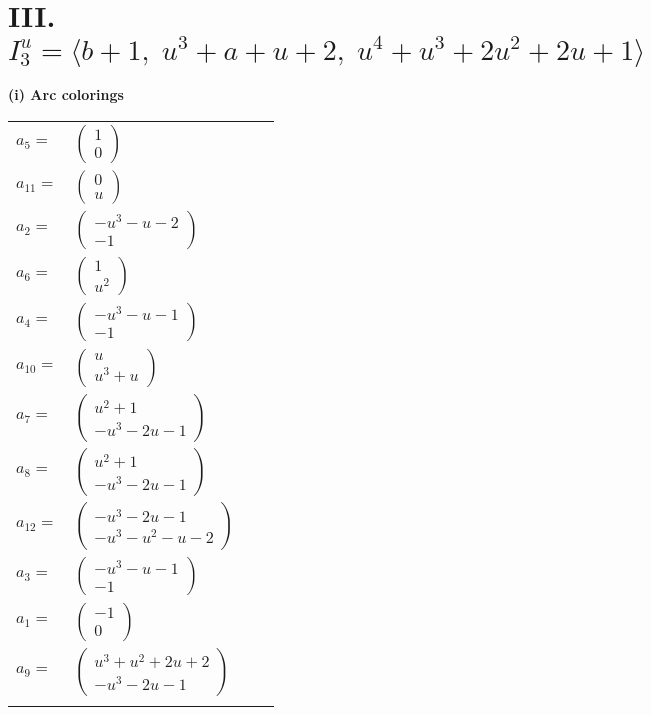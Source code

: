 \documentclass[1p]{elsarticle_modified}
\theoremstyle{definition}
\begin{document}
\centering \section*{III. $I^u_{3}= \langle b+1,\;u^3+a+u+2,\;u^4+u^3+2 u^2+2 u+1 \rangle$}
\flushleft \textbf{(i) Arc colorings}\\
\begin{tabular}{m{7pt} m{180pt} m{7pt} m{180pt} }
\flushright $a_{5}=$&$\begin{pmatrix}1\\0\end{pmatrix}$ \\
\flushright $a_{11}=$&$\begin{pmatrix}0\\u\end{pmatrix}$ \\
\flushright $a_{2}=$&$\begin{pmatrix}- u^3- u-2\\-1\end{pmatrix}$ \\
\flushright $a_{6}=$&$\begin{pmatrix}1\\u^2\end{pmatrix}$ \\
\flushright $a_{4}=$&$\begin{pmatrix}- u^3- u-1\\-1\end{pmatrix}$ \\
\flushright $a_{10}=$&$\begin{pmatrix}u\\u^3+u\end{pmatrix}$ \\
\flushright $a_{7}=$&$\begin{pmatrix}u^2+1\\- u^3-2 u-1\end{pmatrix}$ \\
\flushright $a_{8}=$&$\begin{pmatrix}u^2+1\\- u^3-2 u-1\end{pmatrix}$ \\
\flushright $a_{12}=$&$\begin{pmatrix}- u^3-2 u-1\\- u^3- u^2- u-2\end{pmatrix}$ \\
\flushright $a_{3}=$&$\begin{pmatrix}- u^3- u-1\\-1\end{pmatrix}$ \\
\flushright $a_{1}=$&$\begin{pmatrix}-1\\0\end{pmatrix}$ \\
\flushright $a_{9}=$&$\begin{pmatrix}u^3+u^2+2 u+2\\- u^3-2 u-1\end{pmatrix}$\\&\end{tabular}
\end{document}
